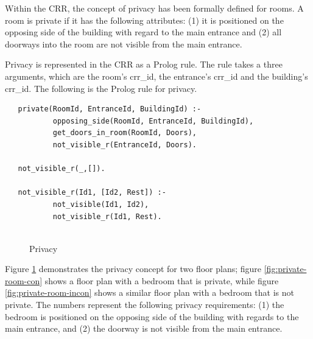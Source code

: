 \documentclass[12pt]{ucthesis}
\begin{document}
Within the CRR, the concept of privacy has been formally defined for rooms. A room is private if it has the following attributes: (1) it is positioned on the opposing side of the building with regard to the main entrance and (2) all doorways into the room are not visible from the main entrance.
 
Privacy is represented in the CRR as a Prolog rule. The rule takes a three arguments, which are the room's crr\_id, the entrance's crr\_id and the building's crr\_id. The following is the Prolog rule for privacy. 
\begin{verbatim}
   private(RoomId, EntranceId, BuildingId) :-  
           opposing_side(RoomId, EntranceId, BuildingId),
           get_doors_in_room(RoomId, Doors),
           not_visible_r(EntranceId, Doors). 

   not_visible_r(_,[]).
   
   not_visible_r(Id1, [Id2, Rest]) :-
           not_visible(Id1, Id2),
           not_visible_r(Id1, Rest).   
   
\end{verbatim}

\begin{figure}[b]
 \centering
  \hspace{5mm}
 \caption{Privacy}
\label{privacy}
\end{figure}

Figure \ref{privacy} demonstrates the privacy concept for two floor plans; figure \ref{fig:private-room-con} shows a floor plan with a bedroom that is  private, while figure \ref{fig:private-room-incon} shows a similar floor plan with a bedroom that is not private. The numbers represent the following privacy requirements: (1) the bedroom is positioned on the opposing side of the building with regards to the main entrance, and (2) the doorway is not visible from the main entrance.
\end{document}
